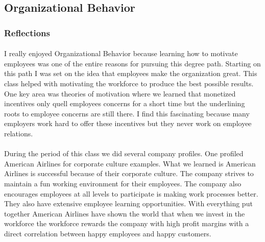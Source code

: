 \documentclass[12pt,titlepage]{article}
\begin{document}

\restoregeometry



\subsection{Organizational Behavior}
\subsubsection{Reflections}
\paragraph {}
I really enjoyed Organizational Behavior because learning how to motivate employees was one of the entire reasons for pursuing this degree path. Starting on this path I was set on the idea that employees make the organization great. This class helped with motivating the workforce to produce the best possible results. One key area was theories of motivation where we learned that monetized incentives only quell employees concerns for a short time but the underlining roots to employee concerns are still there. I find this fascinating because many employers work hard to offer these incentives but they never work on employee relations.
\paragraph {}
During the period of this class we did several company profiles. One profiled American Airlines for corporate culture examples. What we learned is American Airlines is successful because of their corporate culture. The company strives to maintain a fun working environment for their employees. The company also encourages employees at all levels to participate is making work processes better. They also have extensive employee learning opportunities. With everything put together American Airlines have shown the world that when we invest in the workforce the workforce rewards the company with high profit margins with a direct correlation between happy employees and happy customers.
\end{document}

